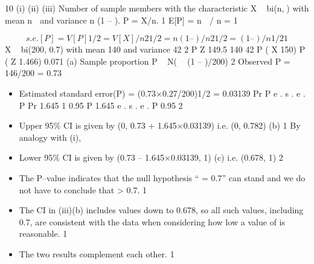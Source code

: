 \documentclass[a4paper,12pt]{article}
\begin{document}
10
(i)
(ii)
(iii)
Number of sample members with the characteristic X ~ bi(n,) with mean
n  and variance n (1 – ). P = X/n. 1
E[P] = n  / n = 1

\[s.e.[P] = {V[P]}1/2 = {V[X]/n 2}1/2 = {n (1 – )/n 2 }1/2 = { (1 – )/n}1/2 1\]
X ~ bi(200, 0.7) with mean 140 and variance 42 2
P Z
149.5 140
42
P ( X 150)
P ( Z
1.466) 0.071
(a) Sample proportion P ~ N(  (1 – )/200)
2
Observed P = 146/200 = 0.73
\begin{itemize}
\item Estimated standard error(P) = (0.73×0.27/200)1/2 = 0.03139
Pr
P
e . s . e . P
Pr
1.645
1
0.95
P 1.645 e . s . e . P
0.95
2
\item Upper 95\% CI is given by (0, 0.73 + 1.645×0.03139)
i.e. (0, 0.782)
(b)
1
By analogy with (i),
\item Lower 95\% CI is given by (0.73 – 1.645×0.03139, 1)
(c)
i.e. (0.678, 1)  2
\item The P–value indicates that the null hypothesis “ = 0.7” can stand and we do not have to conclude that > 0.7. 1
\item The CI in (iii)(b) includes values down to 0.678, so all such values, including 0.7, are consistent with the data when considering how low a value of is reasonable. 1
\item The two results complement each other. 1

\end{itemize}
\end{document}
